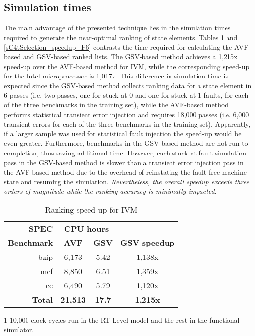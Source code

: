 \documentclass[12pt]{yalephd}
\begin{document}
\subsection{Simulation times}

The main advantage of the presented technique lies in the simulation times required to generate the near-optimal ranking of state elements. Tables \ref{sC4tSelection_speedup_IVM} and \ref{sC4tSelection_speedup_P6} contrasts the time required for calculating the AVF-based and GSV-based ranked lists. The GSV-based method achieves a 1,215x speed-up over the AVF-based method for IVM, while the corresponding speed-up for the Intel microprocessor is 1,017x. This difference in simulation time is expected since the GSV-based method collects ranking data for a state element in 6 passes (i.e. two passes, one for stuck-at-0 and one for stuck-at-1 faults, for each of the three benchmarks in the training set), while the AVF-based method performs statistical transient error injection and requires 18,000 passes (i.e. 6,000 transient errors for each of the three benchmarks in the training set). Apparently, if a larger sample was used for statistical fault injection the speed-up would be even greater. Furthermore, benchmarks in the GSV-based method are not run to completion, thus saving additional time. However, each stuck-at fault simulation pass in the GSV-based method is slower than a transient error injection pass in the AVF-based method due to the overhead of reinstating the fault-free machine state and resuming the simulation. {\em Nevertheless, the overall speedup exceeds three orders of magnitude while the ranking accuracy is minimally impacted}.

\begin{table}[!ht]
\begin{center}
\begin{threeparttable}[b]
\caption{Ranking speed-up for IVM}\label{sC4tSelection_speedup_IVM}
\begin{tabular}{||r|c|c|c||}
\hline
\hline
{\bf SPEC }     & \multicolumn{2}{|c|}{\bf CPU hours}    &                    \\
{\bf Benchmark} &        {\bf AVF\tnote{1}} & {\bf GSV}  & {\bf GSV speedup} \\
\hline
bzip        & 6,173 & 5.42 & 1,138x\\
mcf         & 8,850 & 6.51 & 1,359x\\
cc          & 6,490 & 5.79 & 1,120x\\
\hline
{\bf Total} & {\bf 21,513} & {\bf 17.7} & {\bf 1,215x} \\
\hline
\hline
\end{tabular}
  \begin{tablenotes}
    \item[1] 10,000 clock cycles run in the RT-Level model and the rest in the functional simulator.
  \end{tablenotes}
\end{threeparttable}
\end{center}
\end{table}
\end{document}
